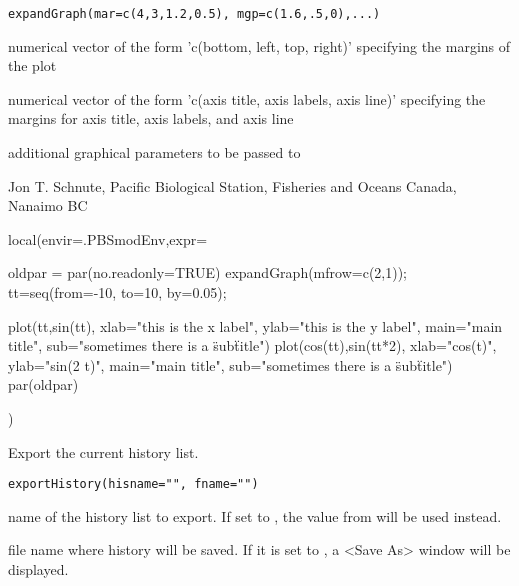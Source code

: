 \documentclass[letterpaper]{book}
\begin{document}
%
\begin{Usage}
\begin{verbatim}
expandGraph(mar=c(4,3,1.2,0.5), mgp=c(1.6,.5,0),...)
\end{verbatim}
\end{Usage}
%
\begin{Arguments}
\begin{ldescription}
\item[\code{mar}] numerical vector of the form 'c(bottom, left, top, right)'
specifying the margins of the plot
\item[\code{mgp}] numerical vector of the form 'c(axis title, axis labels, axis line)'
specifying the margins for axis title, axis labels, and axis line
\item[\code{...}] additional graphical parameters to be passed to 
\end{ldescription}
\end{Arguments}
%
\begin{Author}\relax
Jon T. Schnute, Pacific Biological Station, Fisheries and Oceans Canada, Nanaimo BC
\end{Author}
%
\begin{SeeAlso}\relax
{}
\end{SeeAlso}
%
\begin{Examples}
\begin{ExampleCode}
local(envir=.PBSmodEnv,expr={
  oldpar = par(no.readonly=TRUE)
  expandGraph(mfrow=c(2,1));
  tt=seq(from=-10, to=10, by=0.05);

  plot(tt,sin(tt), xlab="this is the x label",  ylab="this is the y label", 
    main="main title", sub="sometimes there is a \"sub\" title")
  plot(cos(tt),sin(tt*2), xlab="cos(t)", ylab="sin(2 t)", main="main title", 
    sub="sometimes there is a \"sub\" title")
  par(oldpar)
})
\end{ExampleCode}
\end{Examples}
%
\begin{Description}\relax
Export the current history list.
\end{Description}
%
\begin{Usage}
\begin{verbatim}
exportHistory(hisname="", fname="")
\end{verbatim}
\end{Usage}
%
\begin{Arguments}
\begin{ldescription}
\item[\code{hisname}] name of the history list to export. If set to , 
the value from  will be used instead.
\item[\code{fname}] file name where history will be saved. If it is set to , 
a <Save As> window will be displayed.
\end{ldescription}
\end{Arguments}
\end{document}

